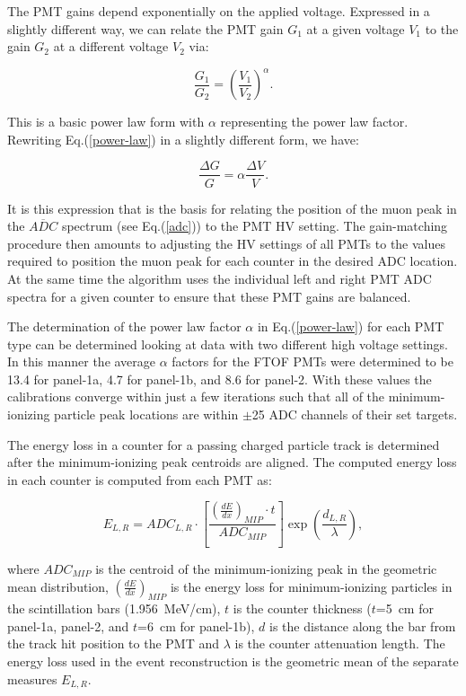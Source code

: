 \documentclass{elsart}
\begin{document}
The PMT gains depend exponentially on the applied voltage. Expressed in a slightly different way, we 
can relate the PMT gain $G_1$ at a given voltage $V_1$ to the gain $G_2$ at a different voltage $V_2$ 
via:

\begin{equation}
\label{power-law}
\frac{G_1}{G_2} = \left( \frac{V_1}{V_2} \right) ^\alpha.
\end{equation}

\noindent
This is a basic power law form with $\alpha$ representing the power law factor. Rewriting 
Eq.(\ref{power-law}) in a slightly different form, we have:

\begin{equation}
\label{delta}
\frac{\Delta G}{G} = \alpha \frac{\Delta V}{V}.
\end{equation}

It is this expression that is the basis for relating the position of the muon peak in the 
$\overline{ADC}$ spectrum (see Eq.(\ref{adc})) to the PMT HV setting. The gain-matching 
procedure then amounts to adjusting the HV settings of all PMTs to the values required to 
position the muon peak for each counter in the desired ADC location. At the same time the 
algorithm uses the individual left and right PMT ADC spectra for a given counter to 
ensure that these PMT gains are balanced.

The determination of the power law factor $\alpha$ in Eq.(\ref{power-law}) for each PMT
type can be determined looking at data with two different high voltage settings. In this manner
the average $\alpha$ factors for the FTOF PMTs were determined to be 13.4 for panel-1a,
4.7 for panel-1b, and 8.6 for panel-2. With these values the calibrations converge within just
a few iterations such that all of the minimum-ionizing particle peak locations are within
$\pm$25 ADC channels of their set targets.

The energy loss in a counter for a passing charged particle track is determined after the
minimum-ionizing peak centroids are aligned. The computed energy loss in each counter is
computed from each PMT as:

\begin{equation}
E_{L,R} = ADC_{L,R} \cdot \left [ \frac{\left( \frac{dE}{dx} \right)_{MIP} \cdot t}{ADC_{MIP}}\right ]
\exp\left(\frac{d_{L,R}}{\lambda}\right),
\end{equation}

\noindent
where $ADC_{MIP}$ is the centroid of the minimum-ionizing peak in the geometric mean distribution,
$\left( \frac{dE}{dx} \right)_{MIP}$ is the energy loss for minimum-ionizing particles in the scintillation
bars (1.956~MeV/cm), $t$ is the counter thickness ($t$=5~cm for panel-1a, panel-2, and $t$=6~cm for
panel-1b), $d$ is the distance along the bar from the track hit position to the PMT and $\lambda$ is the
counter attenuation length. The energy loss used in the event reconstruction is the geometric mean of the
separate measures $E_{L,R}$.
\end{document}
